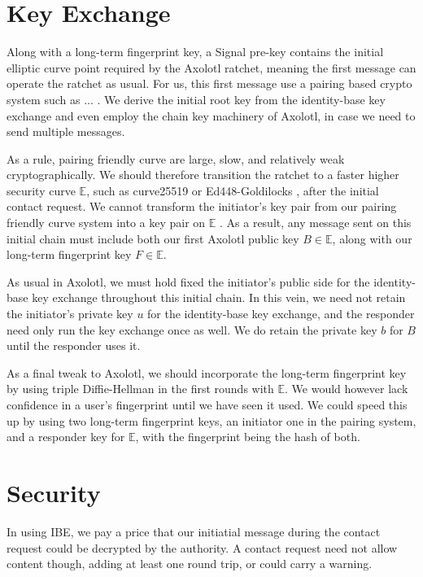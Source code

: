 \documentclass[twoside,letterpaper]{sig-alternate}
\begin{document}
\section{Key Exchange}

Along with a long-term fingerprint key,
a Signal pre-key contains the initial elliptic curve point required
by the Axolotl ratchet, meaning
 the first message can operate the ratchet as usual.
%
For us, this first message use a pairing based crypto system
 such as ... \cite{}.
We derive the initial root key from the identity-base key
exchange and even employ the chain key machinery of Axolotl,
 in case we need to send multiple messages.

As a rule, pairing friendly curve are large, slow, and relatively
 weak cryptographically.
We should therefore transition the ratchet to a faster higher security
curve $\mathbb{E}$, such as curve25519 \cite{} or
 Ed448-Goldilocks \cite{}, after the initial contact request.
We cannot transform the initiator's key pair from
 our pairing friendly curve system
into a key pair on $\mathbb{E}$ \cite{??no_homomorphism??}.
As a result, any message sent on this initial chain must include both
 our first Axolotl public key $B \in \mathbb{E}$, along with
 our long-term fingerprint key $F \in \mathbb{E}$.

As usual in Axolotl, we must hold fixed the initiator's public side
 for the identity-base key exchange throughout this initial chain.
In this vein, we need not retain the initiator's private key $u$ for
 the identity-base key exchange, and
 the responder need only run the key exchange once as well.
We do retain the private key $b$ for $B$ until the responder uses it.

As a final tweak to Axolotl, we should incorporate
the long-term fingerprint key by using triple Diffie-Hellman
in the first rounds with $\mathbb{E}$.
We would however lack confidence in a user's fingerprint until
we have seen it used.
We could speed this up by using two long-term fingerprint keys,
an initiator one in the pairing system, and
 a responder key for $\mathbb{E}$,
with the fingerprint being the hash of both.

\section{Security}


In using IBE, we pay a price that our initiatial message during
 the contact request could be decrypted by the authority.
A contact request need not allow content though, adding at least one round trip,
or could carry a warning.
\end{document}

